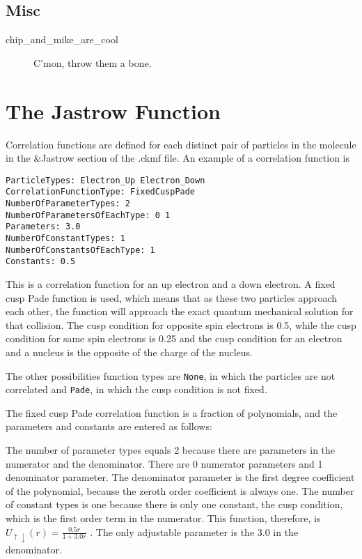 \documentclass{article}
\begin{document}
\subsection{Misc}

\begin{description}

\item [chip\_and\_mike\_are\_cool] C'mon, throw them a bone.

\end{description}

\section{The Jastrow Function}

Correlation functions are defined for each distinct pair of particles in the
molecule in the \&Jastrow section of the .ckmf file.  An example of a
correlation function is

\begin{verbatim}
ParticleTypes: Electron_Up Electron_Down
CorrelationFunctionType: FixedCuspPade
NumberOfParameterTypes: 2
NumberOfParametersOfEachType: 0 1
Parameters: 3.0
NumberOfConstantTypes: 1
NumberOfConstantsOfEachType: 1
Constants: 0.5
\end{verbatim}

This is a correlation function for an up electron and a down
electron.  A fixed cusp Pade function is used, which means that as
these two particles approach each other, the function will approach
the exact quantum mechanical solution for that collision.  The cusp
condition for opposite spin electrons is 0.5, while the cusp condition
for same spin electrons is 0.25 and the cusp condition for an electron
and a nucleus is the opposite of the charge of the nucleus.

The other possibilities function types are \verb-None-, in which the
particles are not correlated and \verb-Pade-, in which the cusp condition
is not fixed.  

The fixed cusp Pade correlation function is a fraction of polynomials,
and the parameters and constants are entered as follows:

The number of parameter types equals 2 because there are parameters in
the numerator and the denominator.  There are 0 numerator parameters
and 1 denominator parameter.  The denominator parameter is the first
degree coefficient of the polynomial, because the zeroth order
coefficient is always one.  The number of constant types is one
because there is only one constant, the cusp condition, which is the
first order term in the numerator.  This function, therefore, is 
\(
U_{\uparrow \downarrow}(r)=\frac{0.5r}{1+3.0r}
\)
.  The only adjustable parameter is the 3.0 in the denominator. 
\end{document}
